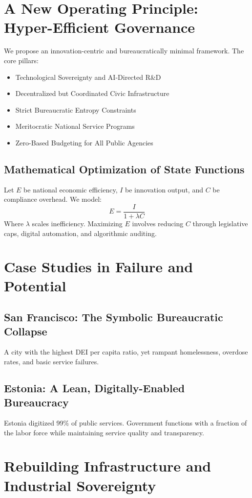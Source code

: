 \documentclass[11pt]{article}
\begin{document}
\section{A New Operating Principle: Hyper-Efficient Governance}
We propose an innovation-centric and bureaucratically minimal framework. The core pillars:
\begin{itemize}
    \item Technological Sovereignty and AI-Directed R\&D
    \item Decentralized but Coordinated Civic Infrastructure
    \item Strict Bureaucratic Entropy Constraints
    \item Meritocratic National Service Programs
    \item Zero-Based Budgeting for All Public Agencies
\end{itemize}

\subsection{Mathematical Optimization of State Functions}
Let $E$ be national economic efficiency, $I$ be innovation output, and $C$ be compliance overhead. We model:
\begin{equation}
E = \frac{I}{1 + \lambda C}
\end{equation}
Where $\lambda$ scales inefficiency. Maximizing $E$ involves reducing $C$ through legislative caps, digital automation, and algorithmic auditing.

\section{Case Studies in Failure and Potential}
\subsection{San Francisco: The Symbolic Bureaucratic Collapse}
A city with the highest DEI per capita ratio, yet rampant homelessness, overdose rates, and basic service failures.

\subsection{Estonia: A Lean, Digitally-Enabled Bureaucracy}
Estonia digitized 99\% of public services. Government functions with a fraction of the labor force while maintaining service quality and transparency.

\section{Rebuilding Infrastructure and Industrial Sovereignty}
\end{document}
